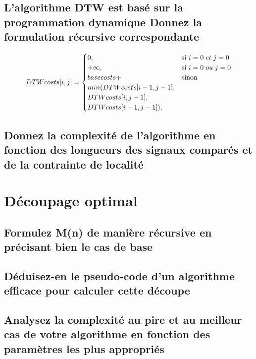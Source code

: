 \documentclass[a4paper,11pt]{article}
\begin{document}
\subsection{L'algorithme DTW est basé sur la programmation dynamique Donnez la formulation récursive correspondante}

  \begin{equation*}
    DTWcosts[i,j] =
    \begin{cases}
      0, & \text{si}\ i = 0 \hspace{0.1cm} et \hspace{0.1cm} j = 0 \\
      +\infty, & \text{si}\ i = 0 \hspace{0.1cm} ou \hspace{0.1cm} j = 0 \\
      basecosts +  & \text{sinon} \\ min(DTWcosts[i-1,j-1],\\DTWcosts[i,j-1],\\ DTWcosts[i-1,j-1]),
    \end{cases}
  \end{equation*}

\subsection{Donnez la complexité de l'algorithme en fonction des longueurs des signaux comparés et de la contrainte de localité}



\section{Découpage optimal}

\subsection{Formulez M(n) de manière récursive en précisant bien le cas de base}

\subsection{Déduisez-en le pseudo-code d'un algorithme efficace pour calculer cette découpe}

\subsection{Analysez la complexité au pire et au meilleur cas de votre algorithme en fonction des paramètres les plus appropriés}
\end{document}
